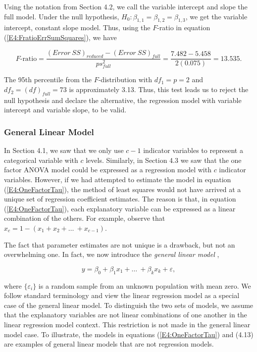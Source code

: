 Using the notation from Section 4.2, we call the variable intercept
and slope the full model. Under the null hypothesis, $H_0:
\beta_{1,1}=\beta_{1,2}=\beta_{1,3}$, we get the variable intercept,
constant slope model. Thus, using the $F$-ratio in equation
(\ref{E4:FratioErrSumSquares}), we have

\begin{equation*}
F\text{-ratio}=\frac{(Error~SS)_{reduced}-(Error~SS)_{full}}{ps_{full}^{2}}=\frac{{7.482-5.458}}{2(0.075)}=13.535.
\end{equation*}

\noindent The 95th percentile from the $F$-distribution with
$df_1=p=2$ and $df_2=(df)_{full}=73$ is approximately 3.13. Thus,
this test leads us to reject the null hypothesis and declare the
alternative, the regression model with variable intercept and
variable slope, to be valid.

\linejed

\subsubsection*{General Linear Model}

In Section 4.1, we saw that we only use $c-1$ indicator variables to
represent a categorical variable with $c$ levels. Similarly, in
Section 4.3 we saw that the one factor ANOVA model could be
expressed as a regression model with $c$ indicator variables.
However, if we had attempted to estimate the model in equation
(\ref{E4:OneFactorTau}), the method of least squares would not have
arrived at a unique set of regression coefficient estimates. The
reason is that, in equation (\ref{E4:OneFactorTau}), each
explanatory variable can be expressed as a
linear combination of the others. For example, observe that $%
x_{c}=1-(x_{1}+x_{2}+\ldots \ +x_{c-1})$.

The fact that parameter estimates are not unique is a drawback, but
not an
overwhelming one. In fact, we now introduce the \textit{general linear model}%
,

\begin{equation} \label{E4:GeneralLinearModel}
y=\beta _{0}+\beta _{1}x_{1}+\ldots \ +\beta _{k}x_{k} +
\varepsilon,
\end{equation}

\noindent where $\{\varepsilon_{i}\}$ is a random sample from an
unknown population with mean zero. We follow standard terminology
and view the linear regression model as a special case of the
general linear model. To distinguish the two sets of models, we
assume that the explanatory variables are not linear combinations of
one another in the linear regression model context. This restriction
is not made in the general linear model case. To illustrate, the
models in equations (\ref{E4:OneFactorTau}) and (4.13) are examples
of general linear models that are not regression models.

